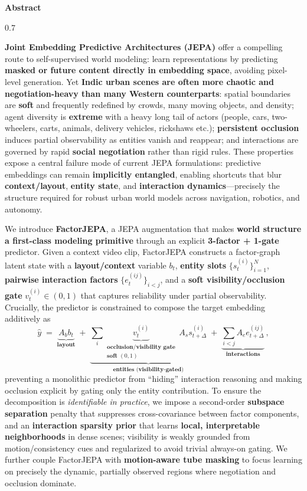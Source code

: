 \documentclass[11pt]{article}
\newcommand{\AbstractTitle}{\textbf{\textcolor{AbsTitle}{\fontsize{18}{18}\selectfont Abstract}}}
\begin{document}
\begin{abstractbox}
  \AbstractTitle
  \vspace{0.6em}
  \begin{spacing}{0.7}

\textbf{Joint Embedding Predictive Architectures (JEPA)} offer a compelling route to self-supervised world modeling: learn representations by predicting \textbf{masked or future content directly in embedding space}, avoiding pixel-level generation. Yet \textbf{Indic urban scenes are often more chaotic and negotiation-heavy than many Western counterparts}: spatial boundaries are \textbf{soft} and frequently redefined by crowds, many moving objects, and density; agent diversity is \textbf{extreme} with a heavy long tail of actors (people, cars, two-wheelers, carts, animals, delivery vehicles, rickshaws etc.); \textbf{persistent occlusion} induces partial observability as entities vanish and reappear; and interactions are governed by rapid \textbf{social negotiation} rather than rigid rules. These properties expose a central failure mode of current JEPA formulations: predictive embeddings can remain \textbf{implicitly entangled}, enabling shortcuts that blur \textbf{context/layout}, \textbf{entity state}, and \textbf{interaction dynamics}---precisely the structure required for robust urban world models across navigation, robotics, and autonomy.

We introduce \textbf{FactorJEPA}, a JEPA augmentation that makes \textbf{world structure a first-class modeling primitive} through an explicit \textbf{3-factor + 1-gate} predictor. Given a context video clip, FactorJEPA constructs a factor-graph latent state with a \textbf{layout/context} variable $b_t$, \textbf{entity slots} $\{s_t^{(i)}\}_{i=1}^{N}$, \textbf{pairwise interaction factors} $\{e_t^{(ij)}\}_{i<j}$, and a \textbf{soft visibility/occlusion gate} $v_t^{(i)}\in(0,1)$ that captures reliability under partial observability.
Crucially, the predictor is constrained to compose the target embedding additively as
\[
\hat y \;=\; \underbrace{A_b b_t}_{\textbf{layout}}
\;+\;
\underbrace{\sum_i \underbrace{v_t^{(i)}}_{\substack{\textbf{occlusion/visibility gate}\\ \textbf{soft }(0,1)}}\, A_s s_{t+\Delta}^{(i)}}_{\textbf{entities (visibility-gated)}}
\;+\;
\underbrace{\sum_{i<j} A_e e_{t+\Delta}^{(ij)}}_{\textbf{interactions}} \,,
\]
preventing a monolithic predictor from ``hiding'' interaction reasoning and making occlusion explicit by gating only the entity contribution.
To ensure the decomposition is \emph{identifiable in practice}, we impose a second-order \textbf{subspace separation} penalty that suppresses cross-covariance between factor components, and an \textbf{interaction sparsity prior} that learns \textbf{local, interpretable neighborhoods} in dense scenes; visibility is weakly grounded from motion/consistency cues and regularized to avoid trivial always-on gating.
We further couple FactorJEPA with \textbf{motion-aware tube masking} to focus learning on precisely the dynamic, partially observed regions where negotiation and occlusion dominate.


\end{spacing}
\end{abstractbox}
\end{document}
